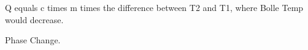 Q equals c times m times the difference between T2 and T1, where Bolle Temp would decrease.

Phase Change.